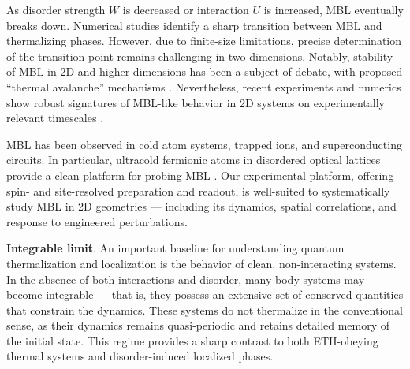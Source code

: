 




As disorder strength $W$ is decreased or interaction $U$ is increased, MBL eventually breaks down. Numerical studies identify a sharp transition between MBL and thermalizing phases. 
However, due to finite-size limitations, precise determination of the transition point remains challenging in two dimensions. Notably, stability of MBL in 2D and higher dimensions has been a subject of debate, with proposed “thermal avalanche” mechanisms \cite{de_roeck_stability_2017}. Nevertheless, recent experiments and numerics show robust signatures of MBL-like behavior in 2D systems on experimentally relevant timescales \cite{choi_exploring_2016,bordia_probing_2017,wahl_signatures_2019}.

MBL has been observed in cold atom systems, trapped ions, and superconducting circuits. In particular, ultracold fermionic atoms in disordered optical lattices provide a clean platform for probing MBL \cite{schreiber_observation_2015,kondov_disorder-induced_2015,choi_exploring_2016}. Our experimental platform, offering spin- and site-resolved preparation and readout, is well-suited to systematically study MBL in 2D geometries — including its dynamics, spatial correlations, and response to engineered perturbations.





\textbf{Integrable limit}.
An important baseline for understanding quantum thermalization and localization is the behavior of clean, non-interacting systems. In the absence of both interactions and disorder, many-body systems may become integrable — that is, they possess an extensive set of conserved quantities that constrain the dynamics. These systems do not thermalize in the conventional sense, as their dynamics remains quasi-periodic and retains detailed memory of the initial state. This regime provides a sharp contrast to both ETH-obeying thermal systems and disorder-induced localized phases.

